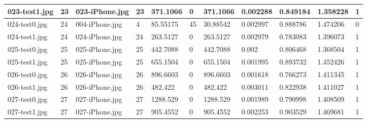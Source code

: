 \begin{landscape}
\begin{longtable}{|p{2cm}|p{1cm}|p{2cm}|p{1cm}|p{2cm}|p{1cm}|p{2cm}|p{2cm}|p{2cm}|p{2cm}|p{1cm}|}
		023-test1.jpg   & 23               & 023-iPhone.jpg        & 23                          & 371.1066              & 0                       & 371.1066                   & 0.002288              & 0.849184              & 1.358228                 & 1                \\ \hline
		024-test0.jpg   & 24               & 004-iPhone.jpg        & 4                           & 85.55175              & 45                      & 30.88542                   & 0.002997              & 0.888786              & 1.474206                 & 0                \\ \hline
		024-test1.jpg   & 24               & 024-iPhone.jpg        & 24                          & 263.5127              & 0                       & 263.5127                   & 0.002979              & 0.783083              & 1.396073                 & 1                \\ \hline
		025-test0.jpg   & 25               & 025-iPhone.jpg        & 25                          & 442.7088              & 0                       & 442.7088                   & 0.002                 & 0.806468              & 1.368504                 & 1                \\ \hline
		025-test1.jpg   & 25               & 025-iPhone.jpg        & 25                          & 655.1504              & 0                       & 655.1504                   & 0.001995              & 0.893732              & 1.452426                 & 1                \\ \hline
		026-test0.jpg   & 26               & 026-iPhone.jpg        & 26                          & 896.6603              & 0                       & 896.6603                   & 0.001618              & 0.766273              & 1.411345                 & 1                \\ \hline
		026-test1.jpg   & 26               & 026-iPhone.jpg        & 26                          & 482.422               & 0                       & 482.422                    & 0.003011              & 0.822938              & 1.411027                 & 1                \\ \hline
		027-test0.jpg   & 27               & 027-iPhone.jpg        & 27                          & 1288.529              & 0                       & 1288.529                   & 0.001989              & 0.790998              & 1.408509                 & 1                \\ \hline
		027-test1.jpg   & 27               & 027-iPhone.jpg        & 27                          & 905.4552              & 0                       & 905.4552                   & 0.002253              & 0.903529              & 1.469681                 & 1                \\ \hline

\end{longtable}
\end{landscape}
